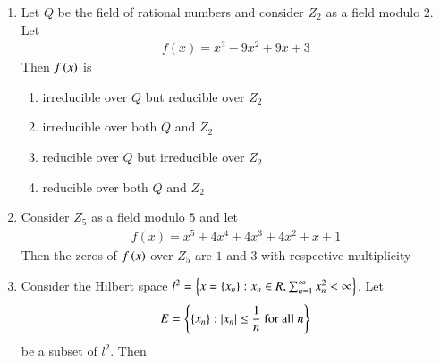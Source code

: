 \documentclass[journal]{IEEEtran}
\begin{document}
\begin{enumerate}
		\begin{enumerate}
        	\end{enumerate}	
	\item Let $Q$ be the field of rational numbers and consider $Z_{2}$ as a field modulo $2$. Let
             \begin{align*}
		f(x)=x^{3}-9 x^{2}+9 x+3
             \end{align*}
		Then $f\left(x\right)$ is
		\begin{enumerate}
			\item irreducible over $Q$ but reducible over $Z_{2}$
            \item irreducible over both $Q$ and $Z_{2}$
            \item reducible over $Q$ but irreducible over $Z_{2}$
            \item reducible over both $Q$ and $Z_{2}$
        	\end{enumerate}	
	\item  Consider $Z_{5}$ as a field modulo $5$ and let
           \begin{align*}
		f(x)=x^{5}+4 x^{4}+4 x^{3}+4 x^{2}+x+1
             \end{align*}
	     Then the zeros of $f\left(x\right)$ over $Z_{5}$ are $1$ and $3$ with respective multiplicity
		\begin{enumerate}
        	\end{enumerate}	
	\item Consider the Hilbert space $l^{2}=\left\{x=\left\{x_{n}\right\}: x_{n} \in R, \sum_{n=1}^{\infty} x_{n}^{2}<\infty\right\}$. Let
             \begin{align*}
		E=\left\{\left\{x_{n}\right\}:\left\vert x_{n}\right\vert\leq \frac{1}{n} \text { for all } n\right\}
             \end{align*}
	     be a subset of $l^2$. Then

\end{enumerate}
\end{document}
